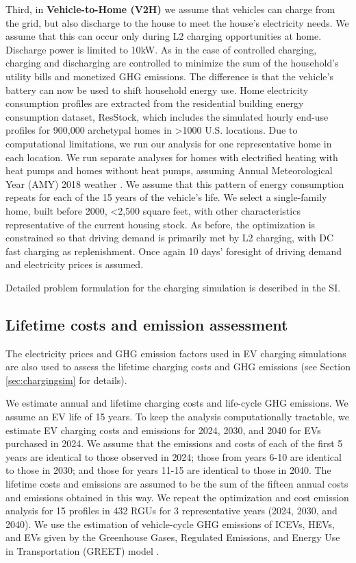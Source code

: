 \documentclass[11pt,preprint]{elsarticle}
\begin{document}
Third, in \textbf{Vehicle-to-Home (V2H)} we assume that vehicles can charge from the grid, but also discharge to the house to meet the house's electricity needs. We assume that this can occur only during L2 charging opportunities at home. Discharge power is limited to 10kW.  As in the case of controlled charging, charging and discharging are controlled to minimize the sum of the household's utility bills and monetized GHG emissions. The difference is that the vehicle's battery can now be used to shift household energy use. Home electricity consumption profiles are extracted from the residential building energy consumption dataset, ResStock, which includes the simulated hourly end-use profiles for 900,000 archetypal homes in >1000 U.S. locations. Due to computational limitations, we run our analysis for one representative home in each location. We run separate analyses for homes with electrified heating with heat pumps and homes without heat pumps, assuming Annual Meteorological Year (AMY) 2018 weather \cite{wilson_end-use_2022}. We assume that this pattern of energy consumption repeats for each of the 15 years of the vehicle's life. We select a single-family home, built before 2000, <2,500 square feet, with other characteristics representative of the current housing stock. As before, the optimization is constrained so that driving demand is primarily met by L2 charging, with DC fast charging as replenishment. Once again 10 days' foresight of driving demand and electricity prices is assumed. 


Detailed problem formulation for the charging simulation is described in the SI. 

\subsection{Lifetime costs and emission assessment}

The electricity prices and GHG emission factors used in EV charging simulations are also used to assess the lifetime charging costs and GHG emissions (see Section \ref{sec:chargingsim} for details).

We estimate annual and lifetime charging costs and life-cycle GHG emissions. We assume an EV life of 15 years. To keep the analysis computationally tractable, we estimate EV charging costs and emissions for 2024, 2030, and 2040 for EVs purchased in 2024. We assume that the emissions and costs of each of the first 5 years are identical to those observed in 2024; those from years 6-10 are identical to those in 2030; and those for years 11-15 are identical to those in 2040. The lifetime costs and emissions are assumed to be the sum of the fifteen annual costs and emissions obtained in this way. We repeat the optimization and cost emission analysis for 15 profiles in 432 RGUs for 3 representative years (2024, 2030, and 2040). We use the estimation of vehicle-cycle GHG emissions of ICEVs, HEVs, and EVs  given by the Greenhouse Gases, Regulated Emissions, and Energy Use in Transportation (GREET) model \cite{wang_greenhouse_2023}.
\end{document}

